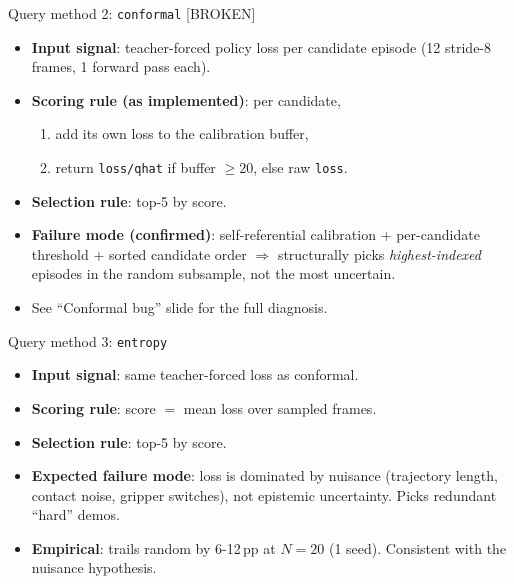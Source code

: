 \documentclass[aspectratio=169]{beamer}
\newcommand{\bad}[1]{\textcolor{bad}{#1}}
\begin{document}
\begin{frame}{Query method 2: \texttt{conformal} \quad\bad{[BROKEN]}}
\begin{itemize}
  \item \textbf{Input signal}: teacher-forced policy loss per candidate episode (12 stride-8 frames, 1 forward pass each).
  \item \textbf{Scoring rule (as implemented)}: per candidate,
    \begin{enumerate}
      \item add its own loss to the calibration buffer,
      \item return \texttt{loss/qhat} if buffer $\geq 20$, else raw \texttt{loss}.
    \end{enumerate}
  \item \textbf{Selection rule}: top-5 by score.
  \item \bad{\textbf{Failure mode (confirmed)}}: self-referential calibration $+$ per-candidate threshold $+$ sorted candidate order $\Rightarrow$ structurally picks \emph{highest-indexed} episodes in the random subsample, not the most uncertain.
  \item See ``Conformal bug'' slide for the full diagnosis.
\end{itemize}
\end{frame}

\begin{frame}{Query method 3: \texttt{entropy}}
\begin{itemize}
  \item \textbf{Input signal}: same teacher-forced loss as conformal.
  \item \textbf{Scoring rule}: score $=$ mean loss over sampled frames.
  \item \textbf{Selection rule}: top-5 by score.
  \item \textbf{Expected failure mode}: loss is dominated by nuisance (trajectory length, contact noise, gripper switches), not epistemic uncertainty. Picks redundant ``hard'' demos.
  \item \textbf{Empirical}: trails random by 6-12\,pp at $N{=}20$ (1 seed). Consistent with the nuisance hypothesis.
\end{itemize}
\end{frame}
\end{document}
